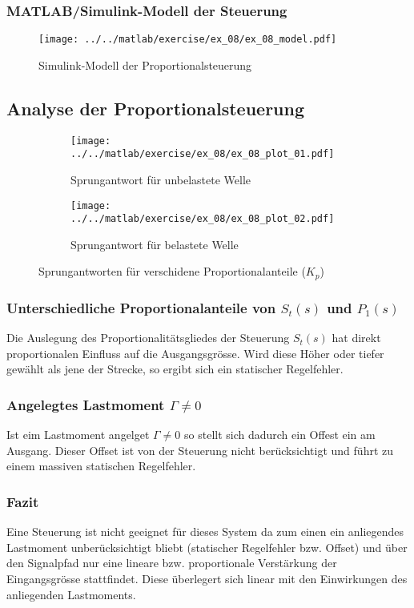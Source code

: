 \subsubsection{MATLAB/Simulink-Modell der Steuerung}



\begin{figure}[h!]
	\centering
	\texttt{[image: ../../matlab/exercise/ex\_08/ex\_08\_model.pdf]}
	\caption{Simulink-Modell der Proportionalsteuerung}
\end{figure}

\subsection{Analyse der Proportionalsteuerung}

\begin{figure}[h!]
	\centering
	\begin{subfigure}{0.45\textwidth}
		\texttt{[image: ../../matlab/exercise/ex\_08/ex\_08\_plot\_01.pdf]}
		\caption{Sprungantwort für unbelastete Welle}
	\end{subfigure}
	\hfill{}
	\begin{subfigure}{0.45\textwidth}
		\texttt{[image: ../../matlab/exercise/ex\_08/ex\_08\_plot\_02.pdf]}
		\caption{Sprungantwort für belastete Welle}
	\end{subfigure}
	\caption{Sprungantworten für verschidene Proportionalanteile ($K_p$)}
\end{figure}

\subsubsection{Unterschiedliche Proportionalanteile von $S_t(s)$ und $P_1(s)$}
Die Auslegung des Proportionalitätsgliedes der Steuerung $S_t(s)$ hat direkt
proportionalen Einfluss auf die Ausgangsgrösse. Wird diese Höher oder tiefer
gewählt als jene der Strecke, so ergibt sich ein statischer Regelfehler.

\subsubsection{Angelegtes Lastmoment $\Gamma \neq 0$}
Ist eim Lastmoment angelget $\Gamma \neq 0$ so stellt sich dadurch ein Offest
ein am Ausgang. Dieser Offset ist von der Steuerung nicht berücksichtigt und
führt zu einem massiven statischen Regelfehler.

\subsubsection{Fazit}
Eine Steuerung ist nicht geeignet für dieses System da zum einen ein
anliegendes Lastmoment unberücksichtigt bliebt (statischer Regelfehler bzw.
Offset) und über den Signalpfad nur eine lineare bzw. proportionale
Verstärkung der Eingangsgrösse stattfindet. Diese überlegert sich linear mit
den Einwirkungen des anliegenden Lastmoments.
